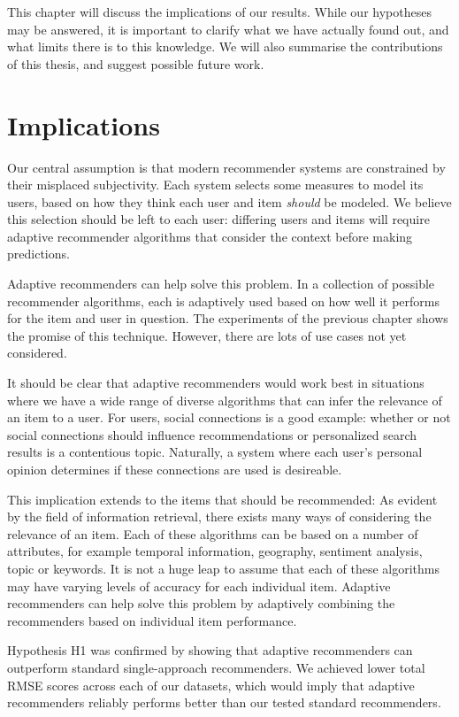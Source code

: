 \label{chap:discussion}

This chapter will discuss the implications of our results.
While our hypotheses may be answered,
it is important to clarify what we have actually found out,
and what limits there is to this knowledge.
We will also summarise the contributions of this thesis,
and suggest possible future work.


\section{Implications}      

Our central assumption is that modern recommender systems 
are constrained by their misplaced subjectivity.
Each system selects some measures to model its users, 
based on how they think each user and item \emph{should} be modeled.
We believe this selection should be left to each user:
differing users and items will require adaptive recommender algorithms that
consider the context before making predictions.

Adaptive recommenders can help solve this problem.
In a collection of possible recommender algorithms, each is adaptively used based 
on how well it performs for the item and user in question.
The experiments of the previous chapter shows the promise of this technique.
However, there are lots of use cases not yet considered.

It should be clear that adaptive recommenders would work best in situations where
we have a wide range of diverse algorithms that can infer the relevance of an item to a user.
For users, social connections is a good example: whether or not social connections should influence
recommendations or personalized search results is a contentious topic.
Naturally, a system where each user's personal opinion determines if these connections are used is desireable.

This implication extends to the items that should be recommended:
As evident by the field of information retrieval,
there exists many ways of considering the relevance of an item. 
Each of these algorithms can be based on a number of attributes, for example
temporal information, geography, sentiment analysis, topic or keywords.
It is not a huge leap to assume that each of these algorithms may have
varying levels of accuracy for each individual item.
Adaptive recommenders can help solve this problem by adaptively 
combining the recommenders based on individual item performance.

Hypothesis H1 was confirmed by showing that adaptive recommenders
can outperform standard single-approach recommenders.
We achieved lower total RMSE scores across each of our datasets,
which would imply that adaptive recommenders
reliably performs better than our tested standard recommenders.

